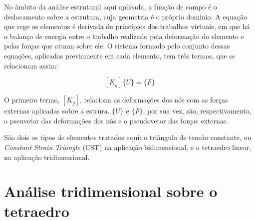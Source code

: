 \begin{figure}
    \label{fig:dominio_triangulo}
\end{figure}

No âmbito da análise estrutural aqui aplicada, a função de campo é o deslocamento sobre a estrutura, cuja geometria é o próprio domínio. A equação que rege os elementos é derivada do princípios dos trabalhos virtuais, em que há o balanço de energia entre o trabalho realizado pela deformação do elemento e pelas forças que atuam sobre ele. O sistema formado pelo conjunto dessas equações, aplicadas previamente em cada elemento, tem três termos, que se relacionam assim:

\begin{equation} \label{eq:sistema_global}
    [K_g] \{U\} = \{F\}
\end{equation}

O primeiro termo, $[K_g]$, relaciona as deformações dos nós com as forças externas aplicadas sobre a estrura. $\{U\}$ e $\{F\}$, por sua vez, são, respectivamento, o pseuvetor das deformações dos nós e o pseudovetor das forças externas.

São dois os tipos de elementos tratados aqui: o triângulo de tensão constante, ou \emph{Constant Strain Triangle} (CST) na aplicação bidimensional, e o tetraedro linear, na aplicação tridimensional.

\section{Análise tridimensional sobre o tetraedro}

